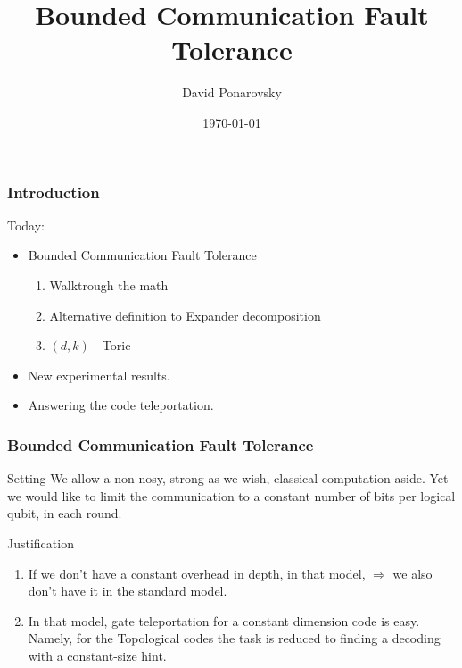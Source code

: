 \documentclass{beamer}
\begin{document}
 

\newcommand*{\Tr}{\textbf{Tr }}


\begin{frame}
  \title{Bounded Communication Fault Tolerance}
    \author{David Ponarovsky}
    \date{\today}
    \titlepage
\end{frame}


\begin{frame}

\frametitle{Introduction}
\begin{block}{Today:}
\begin{itemize}
  \item Bounded Communication Fault Tolerance
    \begin{enumerate}
      \item Walktrough the math 
      \item Alternative definition to Expander decomposition 
      \item $(d,k)$ - Toric 
    \end{enumerate}
  \item New experimental results.  
  \item Answering the code teleportation.  
\end{itemize}
\end{block}
\end{frame}

\begin{frame}
  \frametitle{Bounded Communication Fault Tolerance} 

  \begin{block}{Setting}
    We allow a non-nosy, strong as we wish, classical computation aside. Yet we would like to limit the communication to a constant number of bits per logical qubit, in each round.
\end{block}

\begin{block}{Justification}
  \begin{enumerate}
    \item<+-> If we don't have a constant overhead in depth, in that model, $\Rightarrow$ we also don't have it in the standard model. 
    \item<+-> In that model, gate teleportation for a constant dimension code is easy. Namely, for the Topological codes the task is reduced to finding a decoding with a constant-size hint.  
  \end{enumerate}
\end{block}

\end{frame}
\end{document}
